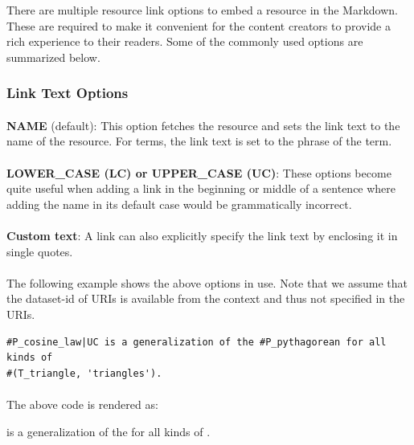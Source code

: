 \documentclass[]{ceurart}
\begin{document}
There are multiple resource link options to embed a resource in the Markdown. These are required to make it convenient for the content creators to provide a rich experience to their readers. Some of the commonly used options are summarized below.

\subsubsection{Link Text Options}

\paragraph{}\textbf{NAME} (default): This option fetches the resource and sets the link text to the name of the resource. For terms, the link text is set to the phrase of the term.

\paragraph{}\textbf{LOWER\_CASE (LC) or UPPER\_CASE (UC)}: These options become quite useful when adding a link in the beginning or middle of a sentence where adding the name in its default case would be grammatically incorrect.

\paragraph{}\textbf{Custom text}: A link can also explicitly specify the link text by enclosing it in single quotes.

\paragraph{}The following example shows the above options in use. Note that we assume that the dataset-id of URIs is available from the context and thus not specified in the URIs.

\begin{verbatim}
#P_cosine_law|UC is a generalization of the #P_pythagorean for all kinds of
#(T_triangle, 'triangles').
\end{verbatim}

\paragraph{}The above code is rendered as:
\begin{mdframed}
 is a generalization of the  for all kinds of .
\end{mdframed}
\end{document}

